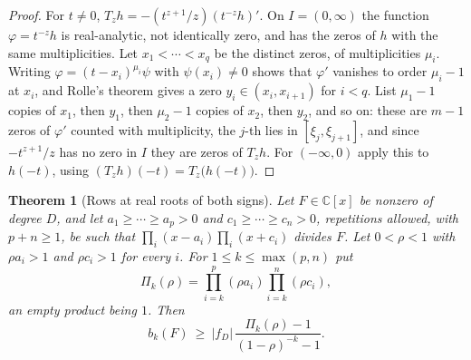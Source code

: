\documentclass[11pt]{article}
\newtheorem{theorem}{Theorem}[section]
\begin{document}
\begin{proof}
For $t\ne0$, $T_zh=-(t^{z+1}/z)(t^{-z}h)'$.  On $I=(0,\infty)$ the function
$\varphi=t^{-z}h$ is real-analytic, not identically zero, and has the zeros of
$h$ with the same multiplicities.  Let $x_1<\cdots<x_q$ be the distinct zeros,
of multiplicities $\mu_i$.  Writing $\varphi=(t-x_i)^{\mu_i}\psi$ with
$\psi(x_i)\ne0$ shows that $\varphi'$ vanishes to order $\mu_i-1$ at $x_i$,
and Rolle's theorem gives a zero $y_i\in(x_i,x_{i+1})$ for $i<q$.  List
$\mu_1-1$ copies of $x_1$, then $y_1$, then $\mu_2-1$ copies of $x_2$, then
$y_2$, and so on: these are $m-1$ zeros of $\varphi'$ counted with
multiplicity, the $j$-th lies in $[\xi_j,\xi_{j+1}]$, and since
$-t^{z+1}/z$ has no zero in $I$ they are zeros of $T_zh$.  For
$(-\infty,0)$ apply this to $h(-t)$, using $(T_zh)(-t)=T_z\bigl(h(-t)\bigr)$.
\end{proof}

\begin{theorem}[Rows at real roots of both signs]\label{thm:bothsigns}
Let $F\in\mathbb C[x]$ be nonzero of degree $D$, and let
$a_1\ge\cdots\ge a_p>0$ and $c_1\ge\cdots\ge c_n>0$, repetitions allowed, with
$p+n\ge1$, be such that $\prod_{i}(x-a_i)\prod_i(x+c_i)$ divides $F$.  Let
$0<\rho<1$ with $\rho a_i>1$ and $\rho c_i>1$ for every $i$.  For
$1\le k\le\max(p,n)$ put
\[
  \Pi_k(\rho)=\prod_{i=k}^{p}(\rho a_i)\prod_{i=k}^{n}(\rho c_i),
\]
an empty product being $1$.  Then
\begin{equation}\label{eq:bothrowsbound}
  b_k(F)\ \ge\ |f_D|\,\frac{\Pi_k(\rho)-1}{(1-\rho)^{-k}-1}.
\end{equation}
\end{theorem}
\end{document}
